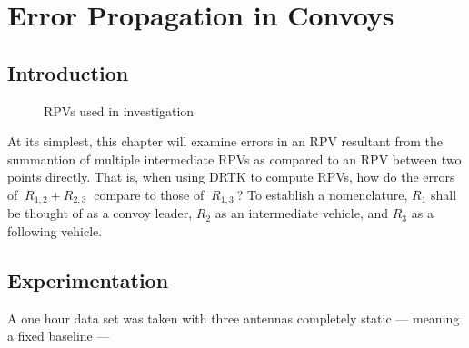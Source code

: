 \chapter{Error Propagation in Convoys} \label{chap:errprop}

\section{Introduction} \label{sec:errintro}

\begin{figure}[ht] \centering \label{fig:rpvs}
\caption{RPVs used in investigation}
\end{figure}

At its simplest, this chapter will examine errors in an RPV resultant from the summantion of multiple intermediate RPVs as compared to an RPV between two points directly. That is, when using DRTK to compute RPVs, how do the errors of $~R_{1,2}+R_{2,3}~$  compare to those of $~R_{1,3}~$? To establish a nomenclature, $R_1$ shall be thought of as a convoy leader, $R_2$ as an intermediate vehicle, and $R_3$ as a following vehicle.


\section{Experimentation}
A one hour data set was taken with three antennas completely static --- meaning a fixed baseline --- 

